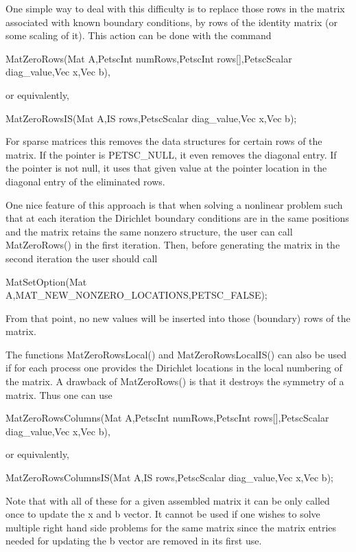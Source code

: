 One simple way to deal with this difficulty is to replace those rows in the
matrix associated with known boundary conditions, by rows of the
identity matrix (or some scaling of it). This action can be done with
the command
\begin{tabbing}
  MatZeroRows(Mat A,PetscInt numRows,PetscInt rows[],PetscScalar diag\_value,Vec x,Vec b),
\end{tabbing}
or equivalently,
\begin{tabbing}
  MatZeroRowsIS(Mat A,IS rows,PetscScalar diag\_value,Vec x,Vec b);
\end{tabbing}
For sparse matrices this removes the data structures for certain rows
of the matrix. If the pointer  is PETSC\_NULL, it
even removes the diagonal entry. If the pointer is not null, it uses that
given value at the pointer location
in the diagonal entry of the eliminated rows.

One nice feature of this approach is that when solving a nonlinear problem
such that at each iteration the Dirichlet boundary conditions are in the
same positions and the matrix retains the same nonzero structure, the user
can call MatZeroRows() in the first iteration. Then, before generating
the matrix in the second iteration the user should call
\begin{tabbing}
  MatSetOption(Mat A,MAT\_NEW\_NONZERO\_LOCATIONS,PETSC\_FALSE);
\end{tabbing}
From that point,
no new values will be inserted into those (boundary) rows of
the matrix. 

The functions MatZeroRowsLocal() and MatZeroRowsLocalIS() can also be used if for each process one provides the Dirichlet locations in the local numbering of the matrix.
A drawback of MatZeroRows() is that it destroys the symmetry of a matrix. Thus one can use
\begin{tabbing}
  MatZeroRowsColumns(Mat A,PetscInt numRows,PetscInt rows[],PetscScalar diag\_value,Vec x,Vec b),
\end{tabbing}
or equivalently,
\begin{tabbing}
  MatZeroRowsColumnsIS(Mat A,IS rows,PetscScalar diag\_value,Vec x,Vec b);
\end{tabbing}
Note that with all of these for a given assembled matrix it can be
only called once to update the x and b vector. It cannot be used if
one wishes to solve multiple right hand side problems for the same
matrix since the matrix entries needed for updating the b vector are
removed in its first use.

